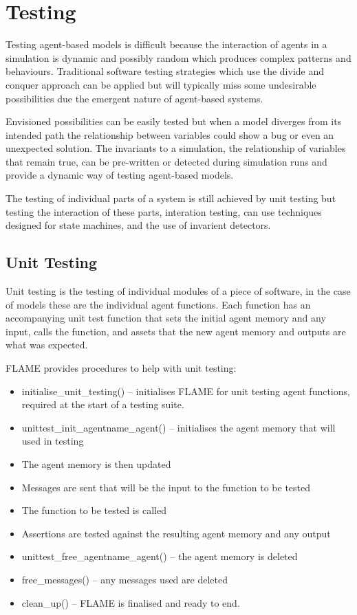 \section{Testing}

Testing agent-based models is difficult because the interaction of agents in a
simulation is dynamic and possibly random which produces complex patterns and
behaviours. Traditional software testing strategies which use the divide and
conquer approach can be applied but will typically miss some undesirable
possibilities due the emergent nature of agent-based systems.

Envisioned possibilities can be easily tested but when a model diverges from
its intended path the relationship between variables could show a bug or even
an unexpected solution. The invariants to a simulation, the relationship of
variables that remain true, can be pre-written or detected during simulation
runs and provide a dynamic way of testing agent-based models.

The testing of individual parts of a system is still achieved by unit testing
but testing the interaction of these parts, interation testing, can use
techniques designed for state machines, and the use of invarient detectors.

\subsection{Unit Testing}

Unit testing is the testing of individual modules of a piece of software, in the
case of models these are the individual agent functions. Each function has an
accompanying unit test function that sets the initial agent memory and any input,
calls the function, and assets that the new agent memory and outputs are what
was expected.

FLAME provides procedures to help with unit testing:

\begin{itemize}
  \item initialise\_unit\_testing() -- initialises FLAME for unit testing agent
  functions, required at the start of a testing suite.
  \item unittest\_init\_agentname\_agent() -- initialises the agent memory that
  will used in testing
  \item The agent memory is then updated
  \item Messages are sent that will be the input to the function to be tested
  \item The function to be tested is called
  \item Assertions are tested against the resulting agent memory and any output
  \item unittest\_free\_agentname\_agent() -- the agent memory is deleted
  \item free\_messages() -- any messages used are deleted
  \item clean\_up() -- FLAME is finalised and ready to end.
\end{itemize}


